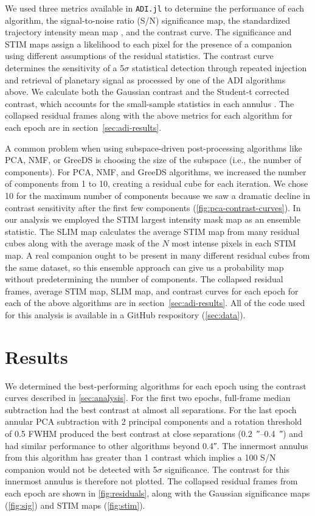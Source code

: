 \documentclass[twocolumn,linenumbers]{aastex631}
\begin{document}
We used three metrics available in \texttt{ADI.jl} to determine the performance of each algorithm, the signal-to-noise ratio (S/N) significance map, the standardized trajectory intensity mean map \citep[STIM map;][]{pairetSTIMMapDetection2019}, and the contrast curve. The significance and STIM maps assign a likelihood to each pixel for the presence of a companion using different assumptions of the residual statistics. The contrast curve determines the sensitivity of a 5$\sigma$ statistical detection through repeated injection and retrieval of planetary signal as processed by one of the ADI algorithms above. We calculate both the Gaussian contrast and the Student-t corrected contrast, which accounts for the small-sample statistics in each annulus \citep{mawetFundamentalLimitationsHigh2014}. The collapsed residual frames along with the above metrics for each algorithm for each epoch are in section~\ref{sec:adi-results}.

A common problem when using subspace-driven post-processing algorithms like PCA, NMF, or GreeDS is choosing the size of the subspace (i.e., the number of components). For PCA, NMF, and GreeDS algorithms, we increased the number of components from 1 to 10, creating a residual cube for each iteration. We chose 10 for the maximum number of components because we saw a dramatic decline in contrast sensitivity after the first few components (\cref{fig:pca-contrast-curves}). In our analysis we employed the STIM largest intensity mask map \citep[SLIM map;][]{pairetSignalProcessingMethods2020} as an ensemble statistic. The SLIM map calculates the average STIM map from many residual cubes along with the average mask of the $N$ most intense pixels in each STIM map. A real companion ought to be present in many different residual cubes from the same dataset, so this ensemble approach can give us a probability map without predetermining the number of components. The collapsed residual frames, average STIM map, SLIM map, and contrast curves for each epoch for each of the above algorithms are in section~\ref{sec:adi-results}. All of the code used for this analysis is available in a GitHub respository (\cref{sec:data}).


\section{Results} \label{sec:results}

We determined the best-performing algorithms for each epoch using the contrast curves described in \cref{sec:analysis}. For the first two epochs, full-frame median subtraction had the best contrast at almost all separations. For the last epoch annular PCA subtraction with 2 principal components and a rotation threshold of 0.5 FWHM produced the best contrast at close separations (\qtyrange{0.2}{0.4}{\arcsecond}) and had similar performance to other algorithms beyond \ang{;;0.4}. The innermost annulus from this algorithm has greater than 1 contrast which implies a 100 S/N companion would not be detected with 5$\sigma$ significance. The contrast for this innermost annulus is therefore not plotted. The collapsed residual frames from each epoch are shown in \cref{fig:residuals}, along with the Gaussian significance maps (\cref{fig:sig}) and STIM maps (\cref{fig:stim}).
\end{document}
